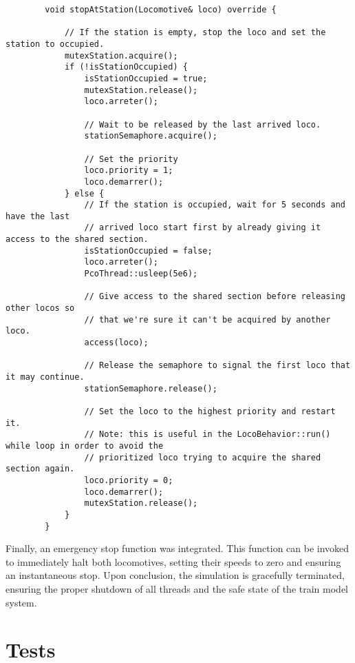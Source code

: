 \documentclass{article}
\begin{document}
    \begin{lstlisting}
        void stopAtStation(Locomotive& loco) override {

            // If the station is empty, stop the loco and set the station to occupied.
            mutexStation.acquire();
            if (!isStationOccupied) {
                isStationOccupied = true;
                mutexStation.release();
                loco.arreter();

                // Wait to be released by the last arrived loco.
                stationSemaphore.acquire();

                // Set the priority
                loco.priority = 1;
                loco.demarrer();
            } else {
                // If the station is occupied, wait for 5 seconds and have the last
                // arrived loco start first by already giving it access to the shared section.
                isStationOccupied = false;
                loco.arreter();
                PcoThread::usleep(5e6);

                // Give access to the shared section before releasing other locos so
                // that we're sure it can't be acquired by another loco.
                access(loco);

                // Release the semaphore to signal the first loco that it may continue.
                stationSemaphore.release();

                // Set the loco to the highest priority and restart it.
                // Note: this is useful in the LocoBehavior::run() while loop in order to avoid the
                // prioritized loco trying to acquire the shared section again.
                loco.priority = 0;
                loco.demarrer();
                mutexStation.release();
            }
        }
    \end{lstlisting}

    Finally, an emergency stop function was integrated. This function can be invoked to immediately halt both locomotives, setting their speeds to zero and ensuring an instantaneous stop. Upon conclusion, the simulation is gracefully terminated, ensuring the proper shutdown of all threads and the safe state of the train model system.



    \pagebreak

    \section{Tests}
\end{document}
